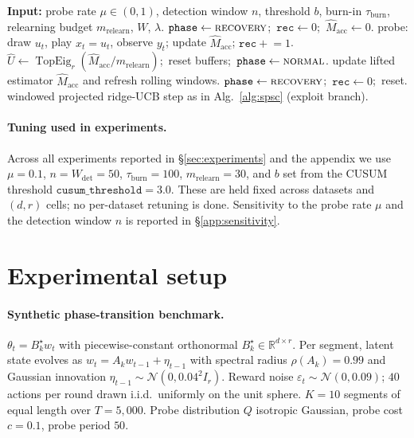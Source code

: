 \documentclass{article}
\newcommand{\R}{\mathbb{R}}
\DeclareMathOperator{\TopEig}{TopEig}
\begin{document}
\begin{algorithm}[H]
\caption{\textbf{SPSC-Adaptive}: unknown boundaries via CUSUM-style detection}
\label{alg:spsc_adaptive}
\begin{algorithmic}[1]
\State \textbf{Input:} probe rate $\mu\in(0,1)$, detection window $n$,
       threshold $b$, burn-in $\tau_{\mathrm{burn}}$, relearning budget $m_{\mathrm{relearn}}$, $W$, $\lambda$.
\State $\mathtt{phase}\leftarrow\textsc{recovery}$;\ $\mathtt{rec}\leftarrow 0$;\ $\widehat M_{\mathrm{acc}}\leftarrow 0$.
      \State probe: draw $u_t$, play $x_t=u_t$, observe $y_t$; update $\widehat M_{\mathrm{acc}}$; $\mathtt{rec}\mathrel{+}= 1$.
          \State $\widehat U\leftarrow \TopEig_r(\widehat M_{\mathrm{acc}}/m_{\mathrm{relearn}})$;\ reset buffers;\ $\mathtt{phase}\leftarrow\textsc{normal}$.
      \EndIf
  \Else{}
          \State update lifted estimator $\widehat M_{\mathrm{acc}}$ and refresh rolling windows.
              \State $\mathtt{phase}\leftarrow\textsc{recovery}$;\ $\mathtt{rec}\leftarrow 0$;\ reset.
          \EndIf
      \Else
          \State windowed projected ridge-UCB step as in Alg.~\ref{alg:spsc} (exploit branch).
      \EndIf
  \EndIf
\EndFor
\end{algorithmic}
\end{algorithm}

\paragraph{Tuning used in experiments.}
Across all experiments reported in \S\ref{sec:experiments} and the
appendix we use $\mu=0.1$, $n=W_{\mathrm{det}}=50$,
$\tau_{\mathrm{burn}}=100$, $m_{\mathrm{relearn}}=30$, and
$b$ set from the CUSUM threshold $\mathtt{cusum\_threshold}=3.0$.
These are held fixed across datasets and $(d,r)$ cells; no
per-dataset retuning is done. Sensitivity to the probe rate $\mu$
and the detection window $n$ is reported in
\S\ref{app:sensitivity}.

\section{Experimental setup}
\label{app:setup}

\paragraph{Synthetic phase-transition benchmark.}
$\theta_t = B_k^\star w_t$ with piecewise-constant orthonormal
$B_k^\star \in \R^{d\times r}$. Per segment, latent state evolves as
$w_t = A_k w_{t-1} + \eta_{t-1}$ with spectral radius $\rho(A_k) = 0.99$
and Gaussian innovation $\eta_{t-1}\sim\mathcal{N}(0, 0.04^2 I_r)$. Reward
noise $\varepsilon_t\sim\mathcal{N}(0,0.09)$; $40$ actions per round drawn
i.i.d.\ uniformly on the unit sphere. $K{=}10$ segments of equal length
over $T{=}5{,}000$. Probe distribution $Q$ isotropic Gaussian,
probe cost $c{=}0.1$, probe period $50$.
\end{document}

